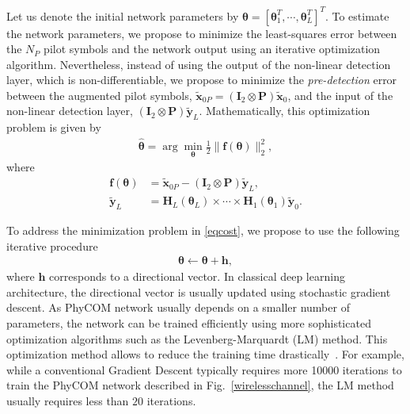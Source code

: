 \documentclass{article}
\begin{document}
Let us denote the initial network parameters by $\boldsymbol\theta = [\boldsymbol \theta_{1}^T,\cdots,\boldsymbol \theta_{L}^T]^T$. To estimate the network parameters, we propose to minimize the least-squares error between the $N_P$ pilot symbols and the network output using an iterative optimization algorithm. Nevertheless, instead of using the output of the non-linear detection layer, which is non-differentiable, we propose to minimize the \emph{pre-detection} error between the augmented pilot symbols, $\tilde{\mathbf{x}}_{0P}=\left(\mathbf{I}_2\otimes \mathbf{P}\right)\tilde{\mathbf{x}}_{0}$, and the input of the non-linear detection layer, $\left(\mathbf{I}_2\otimes \mathbf{P}\right)\tilde{\mathbf{y}}_{L}$. Mathematically, this optimization problem is given by
\begin{align}
\widehat{\boldsymbol \theta}=\arg \min_{\boldsymbol \theta}\frac{1}{2}\|\mathbf{f}(\boldsymbol \theta)\|^2_2,\label{eqcost}
\end{align}
where 
\begin{align}
\mathbf{f}(\boldsymbol \theta)&=\tilde{\mathbf{x}}_{0P}-\left(\mathbf{I}_2\otimes \mathbf{P}\right)\tilde{\mathbf{y}}_{L},\\
\tilde{\mathbf{y}}_{L}&=\mathbf{H}_{L}(\boldsymbol  \theta_L)\times \cdots \times \mathbf{H}_{1}(\boldsymbol  \theta_1)\tilde{\mathbf{y}}_{0}.
\end{align}

To address the minimization problem in \eqref{eqcost}, we propose to use the following iterative procedure 
\begin{align}
\boldsymbol \theta \leftarrow \boldsymbol \theta +\mathbf{h},\label{eqgrad}
\end{align}
where $\mathbf{h}$ corresponds to a directional vector. In classical deep learning architecture, the directional vector is usually updated using stochastic gradient descent. 
As PhyCOM network usually depends on a smaller number of parameters, the network can be trained efficiently using more sophisticated optimization algorithms such as the Levenberg-Marquardt (LM) method. This optimization method allows to reduce the training time drastically~\cite{NOC06,YU11}.
For example, while a conventional Gradient Descent typically requires more 10000 iterations to train the PhyCOM network described in Fig.~\ref{wirelesschannel}, the LM method usually requires less than $20$ iterations.
\end{document}
